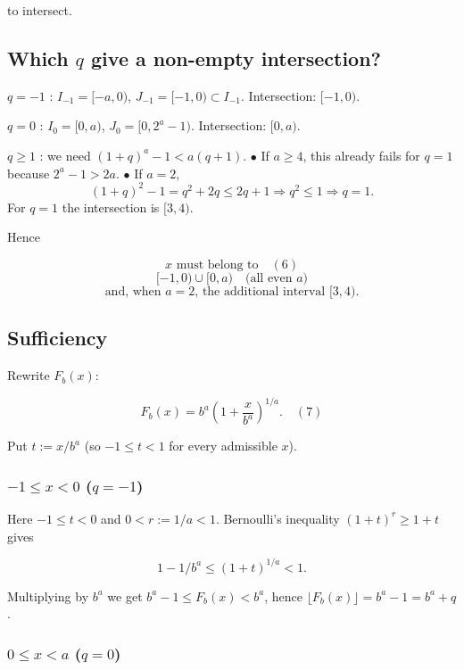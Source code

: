 \documentclass[12pt,a4paper]{article}
\theoremstyle{definition}
\begin{document}
        to intersect.

        \subsection*{Which $q$ give a non-empty intersection?}

        $q = -1$ : $I_{-1}=[-a,0)$, $J_{-1}=[-1,0) \subset I_{-1}$.
        Intersection: $[-1,0)$.

        $q = 0$ : $I_0=[0,a)$, $J_0=[0,2^a-1)$.
        Intersection: $[0,a)$.

        $q \geq 1$ :  we need $(1+q)^a-1 < a(q+1)$.
        $\bullet$ If $a\geq 4$, this already fails for $q=1$ because $2^a-1 > 2a$.
        $\bullet$ If $a=2$,
        $$(1+q)^2-1 = q^2+2q \leq 2q+1 \Rightarrow q^2 \leq 1 \Rightarrow q=1.$$
        For $q=1$ the intersection is $[3,4)$.

        Hence

        $$x \text{ must belong to}\quad(6)$$
        $$[-1,0) \cup [0,a)\quad\text{(all even } a\text{)}$$
        $$\text{and, when } a=2\text{, the additional interval } [3,4).$$

        \subsection*{Sufficiency}

        Rewrite $F_b(x)$:

        $$F_b(x)=b^{a}\left(1+\frac{x}{b^{a}}\right)^{1/a}.\quad(7)$$

        Put $t:=x/b^{a}$ (so $-1\leq t<1$ for every admissible $x$).

        \subsubsection*{$-1 \leq x < 0$ ($q = -1$)}

        Here $-1\leq t<0$ and $0<r:=1/a<1$. Bernoulli's inequality
        $(1+t)^{r} \geq 1+t$ gives

        $$1-1/b^{a} \leq (1+t)^{1/a} < 1.$$

        Multiplying by $b^{a}$ we get $b^{a}-1 \leq F_b(x)<b^{a}$, hence
        $\lfloor F_b(x)\rfloor=b^{a}-1=b^{a}+q$.

        \subsubsection*{$0 \leq x < a$ ($q = 0$)}
\end{document}
